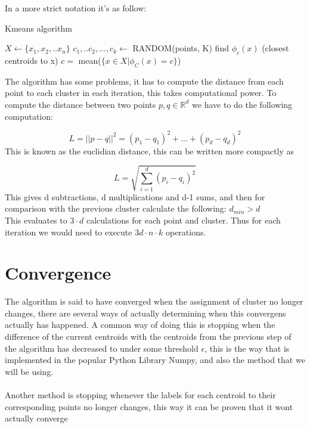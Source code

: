 \documentclass[12pt]{report}
\begin{document}
In a more strict notation it's as follow:

\begin{algorithm}[h!]
  \caption{Kmeans algorithm}
  \begin{algorithmic}

    \State $\textit{X} \gets \{x_1, x_2, .. x_n\}$
    \State $c_1, ..c_2,...,c_k \gets$ RANDOM(points, K)
    find $\phi_c(x)$ (closest centroids to x)
    \EndFor
    $c =$ mean($\{x \in X | \phi_C(x) = c\}$)
    \EndFor
    \EndWhile
    \EndProcedure
  \end{algorithmic}

\end{algorithm}

The algorithm has some problems, it has to compute the distance from each point to each cluster in each iteration, this takes computational power. To compute the distance between two points $p,q \in \mathbb{R}^d$ we have to do the following computation:

\begin{equation}
  L = ||p - q||^2 = (p_1 - q_1)^2 +...+(p_d - q_d)^2
\end{equation}
This is known as the euclidian distance, this can be written more compactly as

\begin{equation}
  L = \sqrt{\sum_{i=1}^d(p_i - q_i)^2}
\end{equation}
This gives d subtractions, d multiplications and d-1 sums, and then for comparison with the previous cluster calculate the following: $d_{min} > d$ \\
This evaluates to $3\cdot d$ calculations for each point and cluster. Thus for each iteration we would need to execute $3d \cdot n \cdot k$ operations.

\section{Convergence}
\label{subsec:Convergens}
The algorithm is said to have converged when the assignment of cluster no longer changes, there are several ways of actually determining when this convergens actually has happened. A common way of doing this is stopping when the difference of the current centroids with the centroids from the previous step of the algorithm has decreased to under some threshold $\epsilon$, this is the way that is implemented in the popular Python Library Numpy, and also the method that we will be using. \\\\
Another method is stopping whenever the labels for each centroid to their corresponding points no longer changes, this way it can be proven that it wont actually converge
\end{document}
